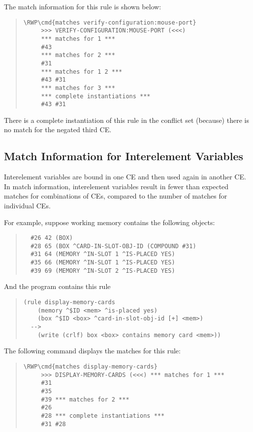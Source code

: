 The match information for this rule is shown below:

\begin{quote}
\begin{Verbatim}[commandchars=\\\{\}]
\RWP\cmd{matches verify-configuration:mouse-port}
     >>> VERIFY-CONFIGURATION:MOUSE-PORT (<<<)
     *** matches for 1 ***
     #43
     *** matches for 2 ***
     #31
     *** matches for 1 2 ***
     #43 #31
     *** matches for 3 ***
     *** complete instantiations ***
     #43 #31
\end{Verbatim}
\end{quote}

There is a complete instantiation of this rule in the conflict set
(because) there is no match for the negated third CE.

\subsection{Match Information for Interelement Variables}

Interelement variables are bound in one CE and then used again in
another CE. In match information, interelement variables result in
fewer than expected matches for combinations of CEs, compared to the
number of matches for individual CEs.

For example, suppose working memory contains the following objects:

\begin{quote}
\begin{verbatim}
  #26 42 (BOX)
  #28 65 (BOX ^CARD-IN-SLOT-OBJ-ID (COMPOUND #31)
  #31 64 (MEMORY ^IN-SLOT 1 ^IS-PLACED YES)
  #35 66 (MEMORY ^IN-SLOT 1 ^IS-PLACED YES)
  #39 69 (MEMORY ^IN-SLOT 2 ^IS-PLACED YES)
\end{verbatim}
\end{quote}

And the program contains this rule

\begin{quote}
\begin{verbatim}
(rule display-memory-cards
    (memory ^$ID <mem> ^is-placed yes)
    (box ^$ID <box> ^card-in-slot-obj-id [+] <mem>)
  -->
    (write (crlf) box <box> contains memory card <mem>))
\end{verbatim}
\end{quote}

The following command displays the matches for this rule:

\begin{quote}
\begin{Verbatim}[commandchars=\\\{\}]
\RWP\cmd{matches display-memory-cards}
     >>> DISPLAY-MEMORY-CARDS (<<<) *** matches for 1 ***
     #31
     #35
     #39 *** matches for 2 ***
     #26
     #28 *** complete instantiations ***
     #31 #28
\end{Verbatim}
\end{quote}

